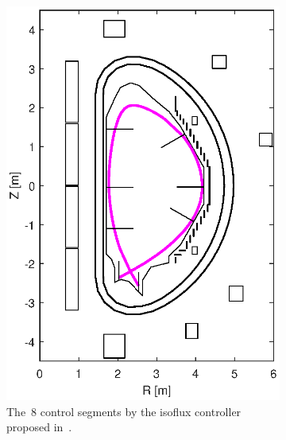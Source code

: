 \begin{figure}[h]
\begin{subfigure}[b]{0.32\textwidth}
		\includegraphics[width=\textwidth]{Chp3/8_gaps.eps} 
		\caption{The~8 control segments by the isoflux controller proposed in~\cite{miyata2013study}.\label{figure:8_gaps}}
	\end{subfigure}
	~
	\begin{subfigure}[b]{0.32\textwidth}

\end{subfigure}
\end{figure}

